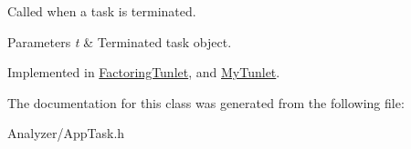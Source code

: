 Called when a task is terminated. 


\begin{DoxyParams}{Parameters}
{\em t} & Terminated task object. \\
\hline
\end{DoxyParams}


Implemented in \hyperlink{class_factoring_tunlet_a08e03f7b58081ee5477af2fd47a5844a}{Factoring\-Tunlet}, and \hyperlink{class_my_tunlet_a1dbfd5d056e172441e58e182ab38bf1b}{My\-Tunlet}.



The documentation for this class was generated from the following file\-:\begin{DoxyCompactItemize}
\item 
Analyzer/App\-Task.\-h\end{DoxyCompactItemize}
